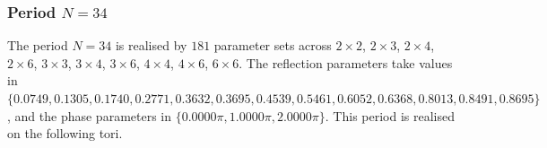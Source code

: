 \par
\subsubsection{Period $N = 34$}
The period $N=34$ is realised by $181$ parameter sets across $2\times2$, $2\times3$, $2\times4$, $2\times6$, $3\times3$, $3\times4$, $3\times6$, $4\times4$, $4\times6$, $6\times6$. The reflection parameters take values in $\{0.0749, 0.1305, 0.1740, 0.2771, 0.3632, 0.3695, 0.4539, 0.5461, 0.6052, 0.6368, 0.8013, 0.8491, 0.8695\}$, and the phase parameters in $\{0.0000\pi, 1.0000\pi, 2.0000\pi\}$. This period is realised on the following tori.
